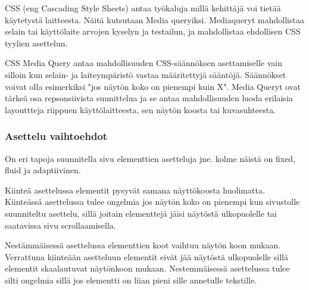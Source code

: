 \documentclass[11pt,a4paper,titlepage,oneside]{article}
\begin{document}
CSS (eng Cascading Style Sheets) antaa työkaluja millä kehittäjä voi tietää käytetystä laitteesta.
Näitä kutsutaan Media queryiksi.
Mediaqueryt mahdollistaa selain tai käyttölaite arvojen kyselyn ja testailun, ja mahdollistaa ehdollisen CSS tyylien asettelun.

\medskip




CSS Media Query antaa mahdollisuuden CSS-säännöksen asettamiselle vain silloin kun selain- ja laiteympäristö vastaa määritettyjä sääntöjä. 
Säännökset voivat olla esimerkiksi "jos näytön koko on pienempi kuin X".
Media Queryt ovat tärkeä osa repsonsiivista suunittelua ja se antaa mahdollisuuden luoda erilaisia layouttteja riippuen käyttölaitteesta,
sen näytön koosta tai kuvasuhteesta.












\subsubsection{Asettelu vaihtoehdot}







On eri tapoja suunnitella sivu elementtien asetteluja jne. kolme näistä on fixed, fluid ja adaptiivinen.
\medskip



Kiinteä asettelussa elementit pysyvät samana näyttökoosta huolimatta. 
Kiinteässä asettelussa tulee ongelmia jos näytön koko on pienempi kun sivustolle suunniteltu asettelu, 
sillä joitain elementtejä jäisi näytöstä ulkopuolelle tai saatavissa sivu scrollaamisella.
\medskip


Nestämmäisessä asettelussa elementtien koot vaihtuu näytön koon mukaan. 
Verrattuna kiinteään asetteluun elementit eivät jää näytöstä ulkopuolelle sillä elementit skaalautuvat näytönkoon mukaan.
Nestemmäisessä asettelussa tulee silti ongelmia sillä jos elementti on liian pieni sille annetulle tekstille.
\medskip
\end{document}
